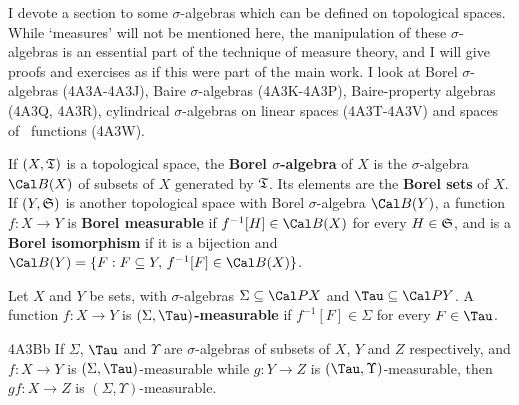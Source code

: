 
\def\chaptername{Appendix}
\def\sectionname{Topological $\sigma$-algebras}

\def\tildeClll{\hbox{$\tilde C$
  \hskip-4.5pt\raise4pt\hbox{\char'23
  \hskip-1.7pt\vrule height6.3pt width.5pt depth0pt
  \hskip.7pt\vrule height6.3pt width.5pt depth0pt
  \hskip-2.5pt\lower5pt\hbox{\char'23}}}}


I devote a section to some $\sigma$-algebras which can be defined on
topological spaces.   While `measures' will not be mentioned here, the
manipulation of these $\sigma$-algebras is an essential part of the
technique of measure theory, and I will give proofs and exercises as if
this were part of the main work.   I look at Borel $\sigma$-algebras
(4A3A-4A3J), %
Baire $\sigma$-algebras (4A3K-4A3P), %
Baire-property algebras (4A3Q, 4A3R), cylindrical $\sigma$-algebras
on linear spaces (4A3T-4A3V) %
and spaces of \cadlag\ functions (4A3W).

 If $(X,\frak T)$ is a topological space, the
{\bf Borel $\sigma$-algebra} of $X$ is the $\sigma$-algebra $\Cal B(X)$
of subsets
of $X$ generated by $\frak T$.   Its elements are the {\bf Borel sets}
of $X$.   If $(Y,\frak S)$ is another topological space with Borel
$\sigma$-algebra $\Cal B(Y)$, a function $f:X\to Y$ is
{\bf Borel measurable} if
$f^{-1}[H]\in\Cal B(X)$ for every $H\in\frak S$, and is a
{\bf Borel isomorphism} if it is a bijection and
$\Cal B(Y)=\{F:F\subseteq Y,\,f^{-1}[F]\in\Cal B(X)\}$.

 Let $X$ and $Y$ be sets, with $\sigma$-algebras
$\Sigma\subseteq\Cal PX$ and
$\Tau\subseteq\Cal PY$.   A function $f:X\to Y$ is
$(\Sigma,\Tau)${\bf-measurable} if $f^{-1}[F]\in\Sigma$ for every
$F\in\Tau$.

\spheader 4A3Bb If $\Sigma$, $\Tau$ and $\Upsilon$ are $\sigma$-algebras
of subsets of $X$, $Y$ and $Z$ respectively, and $f:X\to Y$ is
$(\Sigma,\Tau)$-measurable while $g:Y\to Z$ is
$(\Tau,\Upsilon)$-measurable, then $gf:X\to Z$ is
$(\Sigma,\Upsilon)$-measurable.  

